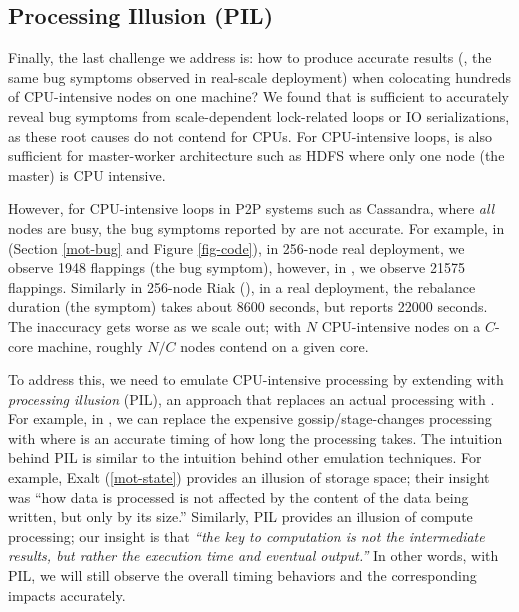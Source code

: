 

\subsection{Processing Illusion (PIL)}
\label{sc-pil}




Finally, the last challenge we address is: how to produce accurate results
(\ie, the same bug symptoms observed in real-scale deployment) when
colocating hundreds of CPU-intensive nodes on one machine?
%
We found that \stest is sufficient to accurately reveal bug symptoms from
scale-dependent lock-related loops or IO serializations, as these root
causes do not contend for CPUs.
%
For CPU-intensive loops, \stest is also sufficient for master-worker
architecture such as HDFS where only one node (the master) is CPU
intensive.


However, for CPU-intensive loops in P2P systems such as Cassandra, where
{\em all} nodes are busy, the bug symptoms reported by \stest are not
accurate.
%
For example, in \caone (Section \ref{mot-bug} and Figure \ref{fig-code}), 
in 256-node real deployment, we observe 1948 flappings (the bug symptom),
however, in \stest, we observe 21575 flappings.
%
Similarly in 256-node Riak (\riakone), in a real deployment, the
rebalance duration (the symptom) takes about 8600 seconds, but \stest
reports 22000 seconds.
%
The inaccuracy gets worse as we scale out; with $N$ CPU-intensive nodes on
a $C$-core machine, roughly $N/C$ nodes contend on a given core.



To address this, we need to emulate CPU-intensive processing by extending
\stest with {\em processing illusion} (PIL), an approach that replaces an
actual processing with \sleep.  For example, in \caone, we can replace the
expensive gossip/stage-changes processing with  where 
is an accurate timing of how long the processing takes.
%
The intuition behind PIL is similar to the intuition behind other
emulation techniques.
%
For example, Exalt \cite{Wang+14-Exalt} (\sec\ref{mot-state})
provides an illusion of storage space; their insight was ``how data is
processed is not affected by the content of the data being written, but
only by its size.''
%
Similarly, PIL provides an illusion of compute processing; our insight is
that {\em ``the key to computation is not the intermediate results, but
  rather the execution time and eventual output.''}
%
In other words, with PIL, we will still observe the overall timing
behaviors and the corresponding impacts accurately.



